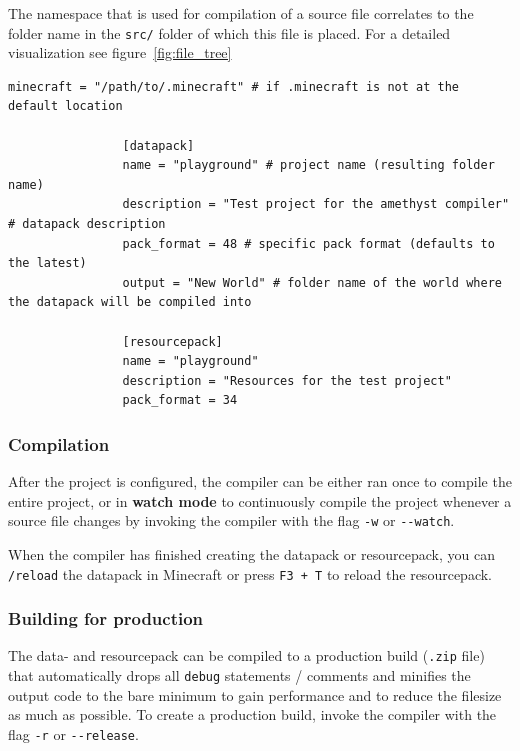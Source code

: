 \documentclass[12pt]{article}
\begin{document}
            The namespace that is used for compilation of a source file correlates to the folder name in the \lstinline{src/} folder of which this file is placed. For a detailed visualization see figure~\ref{fig:file_tree}
            
            \begin{lstlisting}[numbers=none]
                minecraft = "/path/to/.minecraft" # if .minecraft is not at the default location
                
                [datapack]
                name = "playground" # project name (resulting folder name)
                description = "Test project for the amethyst compiler" # datapack description
                pack_format = 48 # specific pack format (defaults to the latest)
                output = "New World" # folder name of the world where the datapack will be compiled into
                
                [resourcepack]
                name = "playground"
                description = "Resources for the test project"
                pack_format = 34
            \end{lstlisting}
            
        \subsubsection{Compilation}
            After the project is configured, the compiler can be either ran once to compile the entire project, or in \textbf{watch mode} to continuously compile the project whenever a source file changes by invoking the compiler with the flag \lstinline{-w} or \lstinline{--watch}.
            
            When the compiler has finished creating the datapack or resourcepack, you can \lstinline{/reload} the datapack in Minecraft or press \lstinline{F3 + T} to reload the resourcepack.
        
        \subsubsection{Building for production}
            The data- and resourcepack can be compiled to a production build (\lstinline{.zip} file) that automatically drops all \lstinline{debug} statements / comments and minifies the output code to the bare minimum to gain performance and to reduce the filesize as much as possible. To create a production build, invoke the compiler with the flag \lstinline{-r} or \lstinline{--release}.
        
\end{document}
